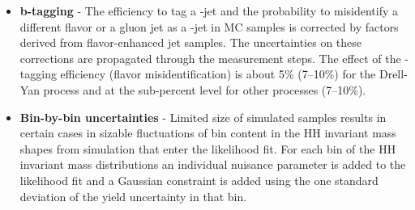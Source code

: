 \begin{itemize}
\item{\bf b-tagging} - The efficiency to tag a \PQb-jet and the
  probability to misidentify a different flavor or a gluon jet as a
  \PQb-jet in MC samples is corrected by factors derived from
  flavor-enhanced jet samples. The uncertainties on these corrections
  are propagated through the measurement steps. The effect of the
  \PQb-tagging efficiency (flavor misidentification) is about 5\% (7--10\%) for the Drell-Yan process and at the sub-percent level for other processes (7--10\%).

\item{\bf Bin-by-bin uncertainties} - Limited size of simulated samples
  results in certain cases in sizable fluctuations of bin content in
  the HH invariant mass shapes from simulation that enter the
  likelihood fit. For each bin of the HH invariant mass distributions
  an individual nuisance parameter is added to the likelihood fit and
  a Gaussian constraint is added using the one standard deviation of
  the yield uncertainty in that bin.


\end{itemize}


